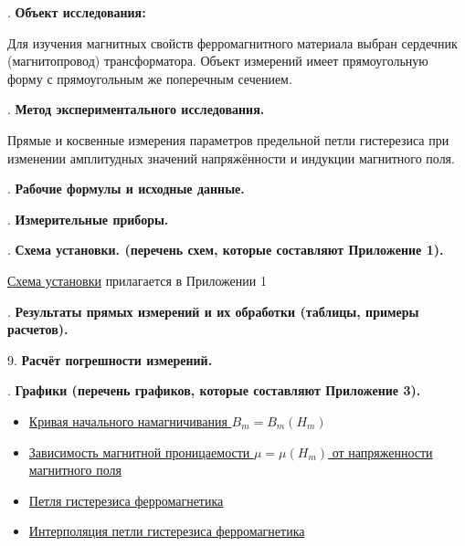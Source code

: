\documentclass[12pt]{article}
\begin{document}
    \mediumvspace

    . \textbf{Объект исследования: } 

    Для изучения магнитных свойств ферромагнитного материала выбран сердечник (магнитопровод) трансформатора. Объект измерений имеет прямоугольную форму с прямоугольным же поперечным сечением.

    \mediumvspace

    . \textbf{Метод экспериментального исследования.}

    Прямые и косвенные измерения параметров предельной петли гистерезиса при изменении амплитудных значений напряжённости и индукции магнитного поля.

    \mediumvspace

    . \textbf{Рабочие формулы и исходные данные.}

    

    \mediumvspace

    \newpage

    . \textbf{Измерительные приборы.}

    \smallvspace

    

    \mediumvspace

    . \textbf{Схема установки. (перечень схем, которые составляют Приложение 1).}

    \hyperlink{schema1}{Схема установки} прилагается в Приложении 1

    \mediumvspace

    . \textbf{Результаты прямых измерений и их обработки (таблицы, примеры расчетов).}

    

    \mediumvspace

    \noindent
    
    9. \textbf{Расчёт погрешности измерений.}
    
    

    \mediumvspace

    . \textbf{Графики (перечень графиков, которые составляют Приложение 3).}

    \begin{itemize}
        \item \hyperlink{diagram1}{Кривая начального намагничивания $B_m = B_m(H_m)$}
        \item \hyperlink{diagram2}{Зависимость магнитной проницаемости $\mu = \mu(H_m)$ от напряженности магнитного поля}
        \item \hyperlink{diagram3}{Петля гистерезиса ферромагнетика}
        \item \hyperlink{diagram4}{Интерполяция петли гистерезиса ферромагнетика}
    \end{itemize}
\end{document}
